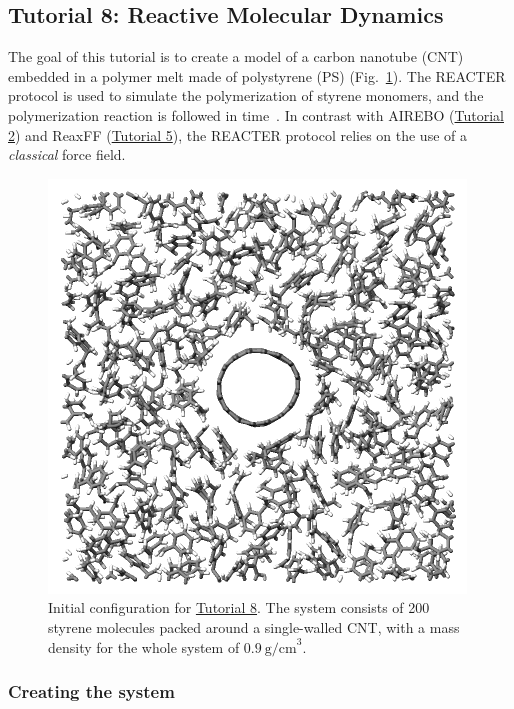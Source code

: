 \documentclass[9pt,tutorial]{livecoms}
\begin{document}
\subsection{Tutorial 8: Reactive Molecular Dynamics}
\label{bond-react-label}

The goal of this tutorial is to create a model of a carbon nanotube (CNT) embedded
in a polymer melt made of polystyrene (PS) (Fig.~\ref{fig:REACT}).  The
REACTER protocol is used to simulate the polymerization of styrene monomers, and the
polymerization reaction is followed in time~\cite{gissinger2017polymer, gissinger2020reacter, gissinger2024molecular}.
In contrast with AIREBO (\hyperref[carbon-nanotube-label]{Tutorial 2})
and ReaxFF (\hyperref[reactive-silicon-dioxide-label]{Tutorial 5}), the REACTER
protocol relies on the use of a \textit{classical} force field.

\begin{figure}
\centering
\includegraphics[width=\linewidth]{REACT.png}
\caption{Initial configuration for \hyperref[bond-react-label]{Tutorial 8}.
The system consists of 200 styrene molecules packed around a single-walled
CNT, with a mass density for the whole system of $0.9~\text{g/cm}^3$.}
\label{fig:REACT}
\end{figure}

\subsubsection{Creating the system}
\end{document}
